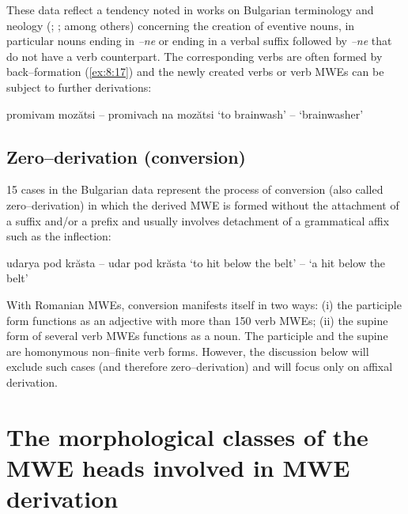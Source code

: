 \documentclass[output=paper]{langsci/langscibook}
\begin{document}
These data reflect a tendency noted in works on Bulgarian terminology
and neology (\citealt{baltova1986}; \citealt{kolkovska1993}; \citealt{kostova2013} among others) concerning the creation of eventive nouns, in particular nouns
ending in \textit{–ne} or ending in a verbal suffix followed by \textit{–ne}  that do
not have a verb counterpart. The corresponding verbs are often formed
by back–formation (\ref{ex:8:17}) and the newly created verbs or verb MWEs can be
subject to further derivations:

\begin{exe}
\ex \label{ex:8:18}
\settowidth{}
promivam mozătsi  –  promivach na mozătsi  
‘to brainwash’ – ‘brainwasher’
\end{exe}

\subsection{Zero–derivation (conversion)}
\label{zero}


15 cases in the Bulgarian data represent the process of conversion (also
called zero–derivation) in which the derived MWE is formed without the
attachment of a suffix and/or a prefix and usually involves detachment
of a grammatical affix such as the inflection:

\begin{exe}
\ex \label{ex:8:19}
\settowidth{}
udarya pod krăsta  – udar pod krăsta  
‘to hit below the belt’ – ‘a hit below the belt’
\end{exe}


With Romanian MWEs, conversion manifests itself in two ways: (i) the
participle form functions as an adjective with more than 150 verb MWEs;
(ii) the supine form of several verb MWEs functions as a noun. The
participle and the supine are homonymous non–finite verb forms.
However, the discussion below will exclude such cases (and therefore
zero–derivation) and will focus only on affixal derivation.



\section{The morphological classes of the MWE heads involved in
MWE derivation}
\label{section5}
\end{document}
